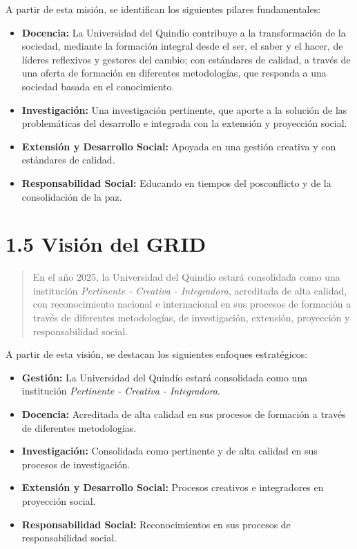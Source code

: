 A partir de esta misión, se identifican los siguientes pilares fundamentales:

\begin{itemize}
    \item \textbf{Docencia:} La Universidad del Quindío contribuye a la transformación de la sociedad, mediante la formación integral desde el ser, el saber y el hacer, de líderes reflexivos y gestores del cambio; con estándares de calidad, a través de una oferta de formación en diferentes metodologías, que responda a una sociedad basada en el conocimiento.

    \item \textbf{Investigación:} Una investigación pertinente, que aporte a la solución de las problemáticas del desarrollo e integrada con la extensión y proyección social.

    \item \textbf{Extensión y Desarrollo Social:} Apoyada en una gestión creativa y con estándares de calidad.

    \item \textbf{Responsabilidad Social:} Educando en tiempos del posconflicto y de la consolidación de la paz.
\end{itemize}

\section*{1.5 Visión del GRID}

\begin{quote}
En el año 2025, la Universidad del Quindío estará consolidada como una institución \textit{Pertinente - Creativa - Integradora}, acreditada de alta calidad, con reconocimiento nacional e internacional en sus procesos de formación a través de diferentes metodologías, de investigación, extensión, proyección y responsabilidad social.
\end{quote}

A partir de esta visión, se destacan los siguientes enfoques estratégicos:

\begin{itemize}
    \item \textbf{Gestión:} La Universidad del Quindío estará consolidada como una institución \textit{Pertinente - Creativa - Integradora}.

    \item \textbf{Docencia:} Acreditada de alta calidad en sus procesos de formación a través de diferentes metodologías.

    \item \textbf{Investigación:} Consolidada como pertinente y de alta calidad en sus procesos de investigación.

    \item \textbf{Extensión y Desarrollo Social:} Procesos creativos e integradores en proyección social.

    \item \textbf{Responsabilidad Social:} Reconocimientos en sus procesos de responsabilidad social.
\end{itemize}

